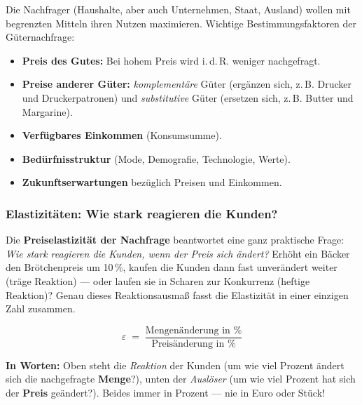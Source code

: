 \documentclass[11pt, a4paper]{article}
\begin{document}
Die Nachfrager (Haushalte, aber auch Unternehmen, Staat, Ausland) wollen mit begrenzten
Mitteln ihren Nutzen maximieren. Wichtige Bestimmungsfaktoren der Güternachfrage:

\begin{itemize}
  \item \textbf{Preis des Gutes:} Bei hohem Preis wird i.\,d.\,R. weniger nachgefragt.
  \item \textbf{Preise anderer Güter:} \emph{komplementäre} Güter (ergänzen sich, z.\,B.
    Drucker und Druckerpatronen) und \emph{substitutive} Güter (ersetzen sich, z.\,B.
    Butter und Margarine).
  \item \textbf{Verfügbares Einkommen} (Konsumsumme).
  \item \textbf{Bedürfnisstruktur} (Mode, Demografie, Technologie, Werte).
  \item \textbf{Zukunftserwartungen} bezüglich Preisen und Einkommen.
\end{itemize}

\subsubsection{Elastizitäten: Wie stark reagieren die Kunden?}
\label{sec:elastizitaet}

Die \textbf{Preiselastizität der Nachfrage} beantwortet eine ganz praktische Frage:
\emph{Wie stark reagieren die Kunden, wenn der Preis sich ändert?} Erhöht ein Bäcker
den Brötchenpreis um 10\,\%, kaufen die Kunden dann fast unverändert weiter (träge
Reaktion) --- oder laufen sie in Scharen zur Konkurrenz (heftige Reaktion)? Genau
dieses Reaktionsausmaß fasst die Elastizität in einer einzigen Zahl zusammen.

\medskip
\noindent
\begin{minipage}[c]{0.55\textwidth}
\begin{formelbox}
\[
\varepsilon \;=\; \frac{\text{Mengenänderung in \%}}{\text{Preisänderung in \%}}
\]
\end{formelbox}
\end{minipage}\hfill
\begin{minipage}[c]{0.41\textwidth}
\small
\textbf{In Worten:} Oben steht die \emph{Reaktion} der Kunden (um wie viel Prozent
ändert sich die nachgefragte \textbf{Menge}?), unten der \emph{Auslöser} (um wie viel
Prozent hat sich der \textbf{Preis} geändert?). Beides immer in Prozent --- nie in
Euro oder Stück!
\end{minipage}
\medskip
\end{document}

